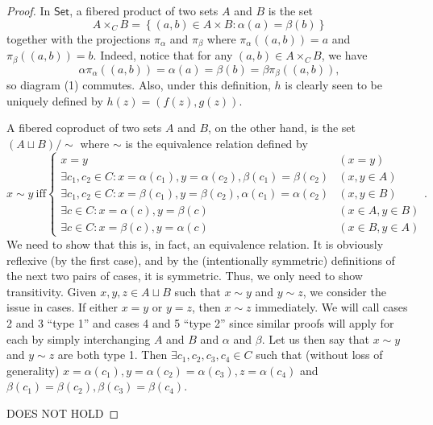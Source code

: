 \documentclass{article}
\theoremstyle{definition}
\begin{document}
\begin{proof}
	In $\mathsf{Set}$, a fibered product of two sets $A$ and $B$ is the set \begin{equation*}
		A \times_C B = \left\lbrace (a, b) \in A \times B : \alpha(a) = \beta(b) \right\rbrace
	\end{equation*}
	together with the projections $\pi_\alpha$ and $\pi_\beta$ where $\pi_\alpha((a, b)) = a$ and $\pi_\beta((a, b)) = b$.
	Indeed, notice that for any $(a, b) \in A \times_C B$, we have \begin{equation*}
		\alpha \pi_\alpha ((a, b)) = \alpha(a) = \beta(b) = \beta \pi_\beta ((a, b)),
	\end{equation*}
	so diagram (1) commutes.
	Also, under this definition, $h$ is clearly seen to be uniquely defined by $h(z) = (f(z), g(z))$.

	A fibered coproduct of two sets $A$ and $B$, on the other hand, is the set $(A \sqcup B)/{\sim}$ where $\sim$ is the equivalence relation defined by \begin{equation*}
		x \sim y\ \mathrm{iff} \begin{cases}
			x = y                                                                              & (x = y)            \\
			\exists c_1, c_2 \in C : x = \alpha(c_1), y = \alpha(c_2), \beta(c_1) = \beta(c_2) & (x, y \in A)       \\
			\exists c_1, c_2 \in C : x = \beta(c_1), y = \beta(c_2), \alpha(c_1) = \alpha(c_2) & (x, y \in B)       \\
			\exists c \in C : x = \alpha(c), y = \beta(c)                                      & (x \in A, y \in B) \\
			\exists c \in C : x = \beta(c), y = \alpha(c)                                      & (x \in B, y \in A)
		\end{cases}.
	\end{equation*}
  We need to show that this is, in fact, an equivalence relation.
  It is obviously reflexive (by the first case), and by the (intentionally symmetric) definitions of the next two pairs of cases, it is symmetric.
  Thus, we only need to show transitivity.
  Given $x, y, z \in A \sqcup B$ such that $x \sim y$ and $y \sim z$, we consider the issue in cases.
  If either $x = y$ or $y = z$, then $x \sim z$ immediately.
  We will call cases 2 and 3 ``type 1'' and cases 4 and 5 ``type 2'' since similar proofs will apply for each by simply interchanging $A$ and $B$ and $\alpha$ and $\beta$.
  Let us then say that $x \sim y$ and $y \sim z$ are both type 1.
  Then $\exists c_1, c_2, c_3, c_4 \in C$ such that (without loss of generality) $x = \alpha(c_1), y = \alpha(c_2) = \alpha(c_3), z = \alpha(c_4)$ and $\beta(c_1) = \beta(c_2), \beta(c_3) = \beta(c_4)$.
  
  DOES NOT HOLD
\end{proof}
\end{document}
